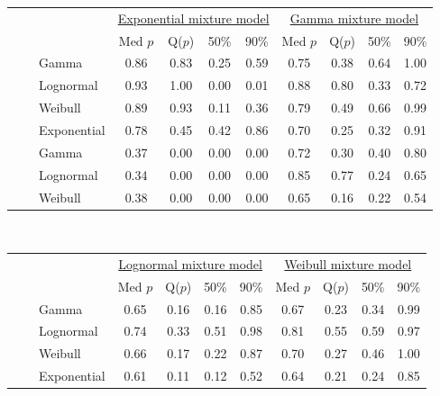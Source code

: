 \documentclass[useAMS,usenatbib,referee,12pt]{article}
\begin{document}
\begin{table}[ht]
\footnotesize\centering
\begin{tabular}{l|l|l|cccc|cccc}
 \multicolumn{3}{c}{ } & \multicolumn{4}{c}{\underline{Exponential mixture model}} & \multicolumn{4}{c}{\underline{Gamma mixture model}} \\
 \multicolumn{3}{c}{ } & Med $p$ & Q($p$) & 50\% & 90\%  & Med $p$ & Q($p$) & 50\% & 90\% \\ 
  \hline
\parbox[t]{2mm}{} & \parbox[t]{2mm}{} & Gamma & 0.86 & 0.83 & 0.25 & 0.59 & 0.75 & 0.38 & 0.64 & 1.00 \\ 
   &  & Lognormal & 0.93 & 1.00 & 0.00 & 0.01 & 0.88 & 0.80 & 0.33 & 0.72 \\ 
   &  & Weibull & 0.89 & 0.93 & 0.11 & 0.36 & 0.79 & 0.49 & 0.66 & 0.99 \\ 
   &  & Exponential & 0.78 & 0.45 & 0.42 & 0.86 & 0.70 & 0.25 & 0.32 & 0.91 \\ 
& \parbox[t]{2mm}{} & Gamma & 0.37 & 0.00 & 0.00 & 0.00 & 0.72 & 0.30 & 0.40 & 0.80 \\ 
   &  & Lognormal & 0.34 & 0.00 & 0.00 & 0.00 & 0.85 & 0.77 & 0.24 & 0.65 \\ 
   &  & Weibull & 0.38 & 0.00 & 0.00 & 0.00 & 0.65 & 0.16 & 0.22 & 0.54 \\ 
   \hline
\end{tabular}
\vspace{0.5cm}\\
\begin{tabular}{l|l|l|cccc|cccc}
 \multicolumn{3}{c}{ } & \multicolumn{4}{c}{\underline{Lognormal mixture model}} & \multicolumn{4}{c}{\underline{Weibull mixture model}} \\
 \multicolumn{3}{c}{ } & Med $p$ & Q($p$) & 50\% & 90\% & Med $p$ & Q($p$) & 50\% & 90\% \\ 
  \hline
\parbox[t]{2mm}{} & \parbox[t]{2mm}{} & Gamma & 0.65 & 0.16 & 0.16 & 0.85 & 0.67 & 0.23 & 0.34 & 0.99 \\ 
   &  & Lognormal & 0.74 & 0.33 & 0.51 & 0.98 & 0.81 & 0.55 & 0.59 & 0.97 \\ 
   &  & Weibull & 0.66 & 0.17 & 0.22 & 0.87 & 0.70 & 0.27 & 0.46 & 1.00 \\ 
   &  & Exponential & 0.61 & 0.11 & 0.12 & 0.52 & 0.64 & 0.21 & 0.24 & 0.85 \\ 

\end{tabular}
\end{table}
\end{document}
